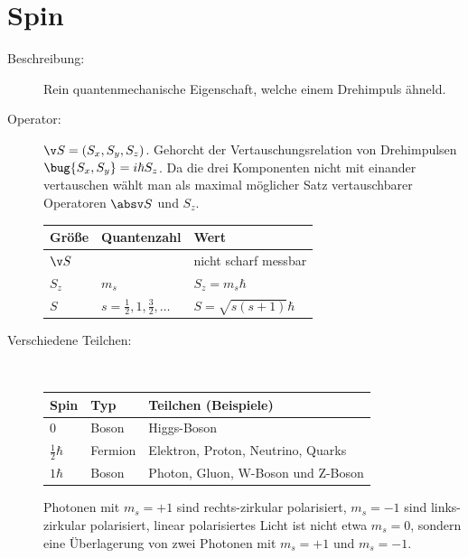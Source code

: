 \documentclass[twocolumn]{summery_4.1}
\begin{document}
\section{Spin}
\begin{description}
    \item[Beschreibung:] Rein quantenmechanische Eigenschaft, welche einem Drehimpuls ähneld. 
    \item[Operator:] \(\v S = (S_x,S_y,S_z)\). Gehorcht der Vertauschungsrelation von Drehimpulsen \(\bug{S_x,S_y} = i\hbar S_z \). Da die drei Komponenten nicht mit einander vertauschen wählt man als maximal möglicher Satz vertauschbarer Operatoren \(\absv S\) und \(S_z\).
    
    \begin{center}
        \begin{tabular}{@{}lll@{}}
            \toprule
            {\bf Größe} & {\bf Quantenzahl} & {\bf Wert}\\\midrule
            \(\v S\) & & nicht scharf messbar\\
            \(S_z\) & \(m_s\)  & \(S_z = m_s\hbar\)\\
            \(S\) & \(s=\frac12,1, \frac32,\dots \) & \(S = \sqrt{s(s+1)}\hbar\)\\\bottomrule
        \end{tabular}
    \end{center}

    \item[Verschiedene Teilchen:]\,\vspace{-1ex}
    
   \begin{center}
     \begin{tabular}{@{}lll@{}}
         \toprule
         {\bf Spin} & {\bf Typ} & {\bf Teilchen (Beispiele)}\\\midrule
         0 & Boson & Higgs-Boson \\
         \(\frac 12 \hbar\) & Fermion & Elektron, Proton, Neutrino, Quarks \\
         \(1\hbar\) & Boson & Photon, Gluon, W-Boson und Z-Boson \\\bottomrule
     \end{tabular}
   \end{center}\vspace{-1ex}
    Photonen mit \(m_s=+1\) sind rechts-zirkular polarisiert, \(m_s=-1\) sind links-zirkular polarisiert, linear polarisiertes Licht ist nicht etwa \(m_s=0\), sondern eine Überlagerung von zwei Photonen mit \(m_s=+1\) und \(m_s=-1\).
\end{description}
\end{document}
